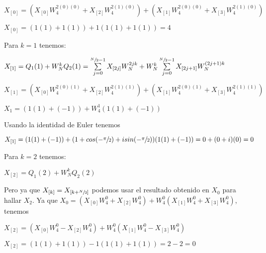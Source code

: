 \documentclass[a4paper]{article}
\begin{document}
\begin{center}
$ X_{[0]} = (X_{[0]} W_{4}^{2(0)(0)} + X_{[2]} W_{4}^{2(1)(0)}) + (X_{[1]} W_{4}^{2(0)(0)} + X_{[3]} W_{4}^{2(1)(0)})$
\end{center}

\begin{center}
$X_{[0]} = (1(1) + 1(1)) + 1(1(1) + 1(1)) = 4$
\end{center}

Para $k = 1$ tenemos:

\begin{center}
$ X_{[1]} = Q_{1}(1) + W_{N}^{k} Q_{2}(1) = \sum \limits_{j=0}^{\sfrac{N}{2} - 1} X_{[2j]} W_{N}^{2jk} + W_{N}^{k} \sum \limits_{j=0}^{\sfrac{N}{2} - 1} X_{[2j+1]} W_{N}^{(2j + 1)k}$
\end{center}

\begin{center}
$ X_{[1]} = (X_{[0]} W_{4}^{2(0)(1)} + X_{[2]} W_{4}^{2(1)(1)}) + (X_{[1]} W_{4}^{2(0)(1)} + X_{[3]} W_{4}^{2(1)(1)})$
\end{center}

\begin{center}
$X_{1} = (1(1) + (-1)) + W_{4}^{1}(1(1) + (-1))$
\end{center}

Usando la identidad de Euler tenemos

\begin{center}
$X_{[1]} = (1(1) + (-1)) + (1 + cos(-\sfrac{\pi}{2}) + i sin(-\sfrac{\pi}{2}))(1(1) + (-1)) = 0 + (0 + i)(0) = 0$
\end{center}

Para $k = 2$ tenemos:

\begin{center}
$ X_{[2]} = Q_{1}(2) + W_{N}^{k} Q_{2}(2)$
\end{center}

Pero ya que $X_{[k]} = X_{[k + \sfrac{N}{2}]}$ podemos usar el resultado obtenido en $X_{0}$ para hallar $X_{2}$. Ya que $X_{0} = (X_{[0]} W_{4}^{0} + X_{[2]} W_{4}^{0}) + W_{4}^{0} (X_{[1]} W_{4}^{0} + X_{[3]} W_{4}^{0})$, tenemos

\begin{center}
$ X_{[2]} = (X_{[0]} W_{4}^{0} - X_{[2]} W_{4}^{0}) + W_{4}^{0}(X_{[1]} W_{4}^{0} - X_{[3]} W_{4}^{0})$
\end{center}

\begin{center}
$ X_{[2]} = (1(1) + 1(1)) - 1(1(1) + 1(1)) = 2 - 2 = 0$
\end{center}
\end{document}
